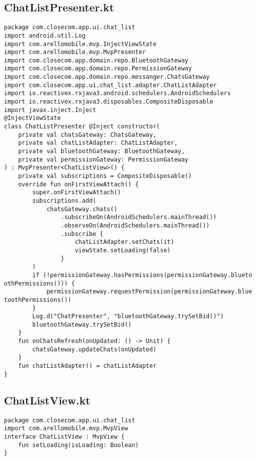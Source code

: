 \documentclass[listing]{espd}
\begin{document}
\subsection{ChatListPresenter.kt}
\begin{verbatim}
package com.closecom.app.ui.chat_list
import android.util.Log
import com.arellomobile.mvp.InjectViewState
import com.arellomobile.mvp.MvpPresenter
import com.closecom.app.domain.repo.BluetoothGateway
import com.closecom.app.domain.repo.PermissionGateway
import com.closecom.app.domain.repo.messanger.ChatsGateway
import com.closecom.app.ui.chat_list.adapter.ChatListAdapter
import io.reactivex.rxjava3.android.schedulers.AndroidSchedulers
import io.reactivex.rxjava3.disposables.CompositeDisposable
import javax.inject.Inject
@InjectViewState
class ChatListPresenter @Inject constructor(
    private val chatsGateway: ChatsGateway,
    private val chatListAdapter: ChatListAdapter,
    private val bluetoothGateway: BluetoothGateway,
    private val permissionGateway: PermissionGateway
) : MvpPresenter<ChatListView>() {
    private val subscriptions = CompositeDisposable()
    override fun onFirstViewAttach() {
        super.onFirstViewAttach()
        subscriptions.add(
            chatsGateway.chats()
                .subscribeOn(AndroidSchedulers.mainThread())
                .observeOn(AndroidSchedulers.mainThread())
                .subscribe {
                    chatListAdapter.setChats(it)
                    viewState.setLoading(false)
                }
        )
        if (!permissionGateway.hasPermissions(permissionGateway.blueto
othPermissions())) {
            permissionGateway.requestPermission(permissionGateway.blue
toothPermissions())
        }
        Log.d("ChatPresenter", "bluetoothGateway.trySetBid()")
        bluetoothGateway.trySetBid()
    }
    fun onChatsRefresh(onUpdated: () -> Unit) {
        chatsGateway.updateChats(onUpdated)
    }
    fun chatListAdapter() = chatListAdapter
}
\end{verbatim}

\subsection{ChatListView.kt}
\begin{verbatim}
package com.closecom.app.ui.chat_list
import com.arellomobile.mvp.MvpView
interface ChatListView : MvpView {
    fun setLoading(isLoading: Boolean)
}
\end{verbatim}
\end{document}
